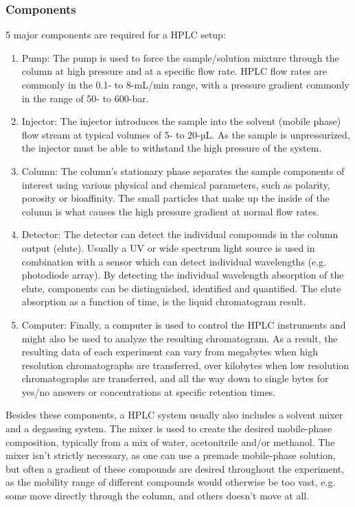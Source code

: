 \subsubsection{Components}
5 major components are required for a HPLC setup:
\begin{enumerate}
    \item Pump: The pump is used to force the sample/solution mixture through the column at high pressure and at a specific flow rate. HPLC flow rates are commonly in the 0.1- to 8-mL/min range, with a pressure gradient commonly in the range of 50- to 600-bar.
    \item Injector: The injector introduces the sample into the solvent (mobile phase) flow stream at typical volumes of 5- to 20-µL. As the sample is unpressurized, the injector must be able to withstand the high pressure of the system.
    \item Column: The column’s stationary phase separates the sample components of interest using various physical and chemical parameters, such as polarity, porosity or bioaffinity. The small particles that make up the inside of the column is what causes the high pressure gradient at normal flow rates. 
    \item Detector: The detector can detect the individual compounds in the column output (elute). Usually a UV or wide spectrum light source is used in combination with a sensor which can detect individual wavelengths (e.g. photodiode array). By detecting the individual wavelength absorption of the elute, components can be distinguished, identified and quantified. The elute absorption as a function of time, is the liquid chromatogram result.
    \item Computer: Finally, a computer is used to control the HPLC instruments and might also be used to analyze the resulting chromatogram. As a result, the resulting data of each experiment can vary from megabytes when high resolution chromatographs are transferred, over kilobytes when low resolution chromatographs are transferred, and all the way down to single bytes for yes/no answers or concentrations at specific retention times. 
\end{enumerate}

Besides these components, a HPLC system usually also includes a solvent mixer and a degassing system. 
The mixer is used to create the desired mobile-phase composition, typically from a mix of water, acetonitrile and/or methanol. The mixer isn’t strictly necessary, as one can use a premade mobile-phase solution, but often a gradient of these compounds are desired throughout the experiment, as the mobility range of different compounds would otherwise be too vast, e.g. some move directly through the column, and others doesn’t move at all.

